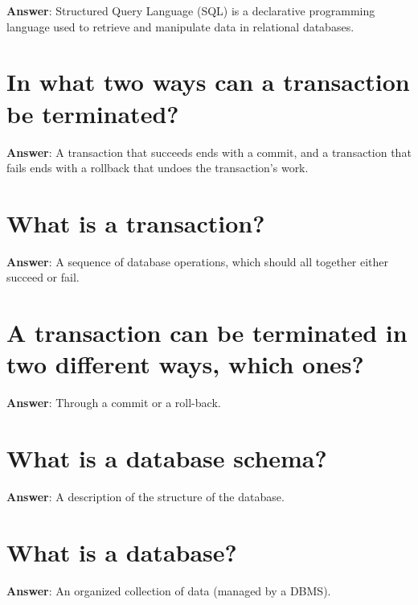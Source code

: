 \documentclass[a4paper,11pt,oneside]{book}
\begin{document}
\begin{sloppypar}
\label{q:284:sa:en:True}

\textbf{Answer}: Structured Query Language (SQL) is a declarative programming language used to retrieve and manipulate data in relational databases.



\section{In what two ways can a transaction be terminated?}

\label{q:285:sa:en:True}

\textbf{Answer}: A transaction that succeeds ends with a commit, and a transaction that fails ends with a rollback that undoes the transaction's work.



\section{What is a transaction?}

\label{q:286:sa:en:True}

\textbf{Answer}: A sequence of database operations, which should all together either succeed or fail.



\section{A transaction can be terminated in two different ways, which ones?}

\label{q:287:sa:en:True}

\textbf{Answer}: Through a commit or a roll-back.



\section{What is a database schema?}

\label{q:288:sa:en:True}

\textbf{Answer}: A description of the structure of the database.



\section{What is a database?}

\label{q:289:sa:en:True}

\textbf{Answer}: An organized collection of data (managed by a DBMS).




\end{sloppypar}
\end{document}
